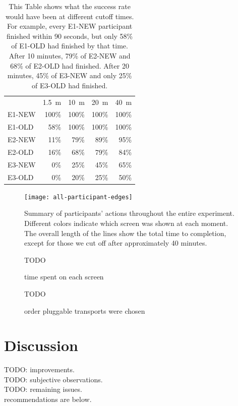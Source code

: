 \documentclass[USenglish,oneside,twocolumn]{article}
\begin{document}
\begin{table}
\centering 
	\begin{tabular}{l r r r r}
	& \multicolumn{1}{c}{1.5~m} & \multicolumn{1}{c}{10~m} & \multicolumn{1}{c}{20~m} & \multicolumn{1}{c}{40~m} \\
	\noalign{\hrule}
	E1-NEW & 100\% & 100\% & 100\% & 100\% \\
	E1-OLD & 58\% & 100\% & 100\% & 100\% \\
	E2-NEW & 11\% & 79\% & 89\% & 95\% \\
	E2-OLD & 16\% & 68\% & 79\% & 84\% \\
	E3-NEW & 0\% & 25\% & 45\% & 65\% \\
	E3-OLD & 0\% & 20\% & 25\% & 50\% \\
	\end{tabular}
\caption{This Table shows what the success rate would have been
at different cutoff times.
For example, every E1-NEW participant finished within 90 seconds,
but only 58\% of E1-OLD had finished by that time.
After 10 minutes, 79\% of E2-NEW and 68\% of E2-OLD had finished.
After 20 minutes, 45\% of E3-NEW and only 25\% of E3-OLD had finished.}
\end{table}

\begin{figure}
\centering
\texttt{[image: all-participant-edges]}
\caption{
Summary of participants' actions throughout the entire experiment.
Different colors indicate which screen was shown at each moment.
The overall length of the lines show the total time to completion,
except for those we cut off after approximately 40 minutes.
}
\label{fig:all-participant-edges}
\end{figure}

\begin{figure} 
{\color {red} TODO} 
\caption{time spent on each screen}
\end{figure} 

\begin{figure} 
{\color {red} TODO} 
\caption{order pluggable transports were chosen}
\end{figure} 

\section{Discussion} 
{\color {red} TODO: improvements.} \\
{\color {red} TODO: subjective observations.} \\
{\color {red} TODO: remaining issues.} \\
{\color {red} recommendations are below.} \\
\end{document}
